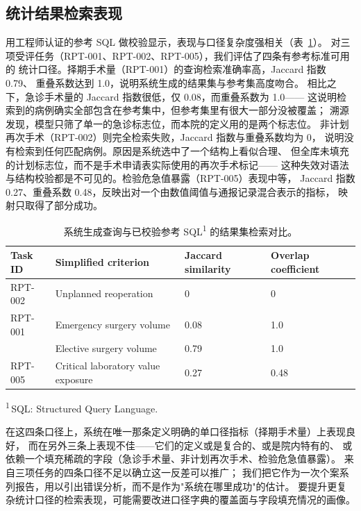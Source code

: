 \documentclass[11pt,a4paper]{article}
\newcommand{\tnote}[1]{\textsuperscript{#1}}
\newcommand{\tabfoot}[1]{\par\vspace{2pt}\begingroup\raggedright\footnotesize
  \noindent #1\par\endgroup}
\newcommand{\tnotedef}[1]{\textsuperscript{#1}\,}
\begin{document}
\subsection{统计结果检索表现}
用工程师认证的参考 SQL 做校验显示，表现与口径复杂度强相关（表~\ref{tab:retrieval}）。
对三项受评任务（RPT-001、RPT-002、RPT-005），我们评估了四条有参考标准可用的
统计口径。择期手术量（RPT-001）的查询检索准确率高，Jaccard 指数 0.79、
重叠系数达到 1.0，说明系统生成的结果集与参考集高度吻合。
相比之下，急诊手术量的 Jaccard 指数很低，仅 0.08，而重叠系数为 1.0——
这说明检索到的病例确实全部包含在参考集中，但参考集里有很大一部分没被覆盖；
溯源发现，模型只筛了单一的急诊标志位，而本院的定义用的是两个标志位。
非计划再次手术（RPT-002）则完全检索失败，Jaccard 指数与重叠系数均为 0，
说明没有检索到任何匹配病例。原因是系统选中了一个结构上看似合理、
但全库未填充的计划标志位，而不是手术申请表实际使用的再次手术标记——
这种失效对语法与结构校验都是不可见的。检验危急值暴露（RPT-005）表现中等，
Jaccard 指数 0.27、重叠系数 0.48，反映出对一个由数值阈值与通报记录混合表示的指标，
映射只取得了部分成功。

\begin{table}[H]
\caption{系统生成查询与已校验参考 SQL\tnote{1} 的结果集检索对比。}
\label{tab:retrieval}
\centering
\footnotesize
\begin{tabular*}{\linewidth}{@{\extracolsep{\fill}}llll@{}}
\toprule
Task ID & Simplified criterion & Jaccard similarity & Overlap coefficient\\
\midrule
RPT-002 & Unplanned reoperation                & 0    & 0\\
RPT-001 & Emergency surgery volume             & 0.08 & 1.0\\
        & Elective surgery volume              & 0.79 & 1.0\\
RPT-005 & Critical laboratory value exposure   & 0.27 & 0.48\\
\bottomrule
\end{tabular*}
\tabfoot{\tnotedef{1}SQL: Structured Query Language.}
\end{table}

在这四条口径上，系统在唯一那条定义明确的单口径指标（择期手术量）上表现良好，
而在另外三条上表现不佳——它们的定义或是复合的、或是院内特有的、
或依赖一个填充稀疏的字段（急诊手术量、非计划再次手术、检验危急值暴露）。
来自三项任务的四条口径不足以确立这一反差可以推广；
我们把它作为一次个案系列报告，用以引出错误分析，而不是作为"系统在哪里成功"的估计。
要提升更复杂统计口径的检索表现，可能需要改进口径字典的覆盖面与字段填充情况的画像。
\end{document}
